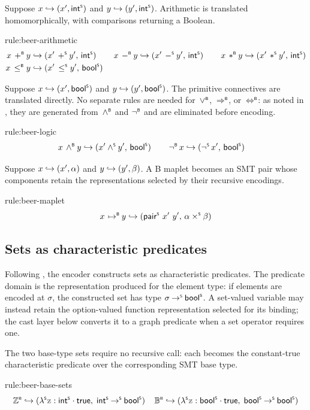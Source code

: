Suppose \(x \encto (x', \intS)\) and \(y \encto (y', \intS)\).
Arithmetic is translated homomorphically, with comparisons returning a Boolean.
\begin{encrule}[arithmetic]{rule:beer-arithmetic}
\[
\begin{aligned}
  x \addB y &\encto (x' \addS y',\, \intS)\mkern20mu
  & x \subB y &\encto (x' \subS y',\, \intS)\mkern20mu
  & x \mulB y &\encto (x' \mulS y',\, \intS) \\
  x \leB y &\encto (x' \leS y',\, \boolS)
\end{aligned}
\]
\end{encrule}

Suppose \(x \encto (x', \boolS)\) and \(y \encto (y', \boolS)\).
The primitive connectives are translated directly.
No separate rules are needed for \(\orB\), \(\impB\), or \(\iffB\): as noted in , they are generated from \(\andB\) and \(\notB\) and are eliminated before encoding.
\begin{encrule}[logic]{rule:beer-logic}
\[
\begin{aligned}
  x \andB y &\encto (x' \andS y',\, \boolS)\mkern20mu
  & \notB x &\encto (\notS x',\, \boolS)
\end{aligned}
\]
\end{encrule}

Suppose \(x \encto (x', \alpha)\) and \(y \encto (y', \beta)\).
A B maplet becomes an SMT pair whose components retain the representations selected by their recursive encodings.
\begin{encrule}[maplet]{rule:beer-maplet}
\[
  x \mapletB y \encto (\pairS{x'}{y'},\, \alpha \timesS \beta)
\]
\end{encrule}

\subsection{Sets as characteristic predicates}
\label{sec:beer-rules-sets}

Following , the encoder constructs sets as characteristic predicates.
The predicate domain is the representation produced for the element type: if elements are encoded at \(\sigma\), the constructed set has type \(\sigma \toS \boolS\).
A set-valued variable may instead retain the option-valued function representation selected for its binding; the cast layer below converts it to a graph predicate when a set operator requires one.

The two base-type sets require no recursive call: each becomes the constant-true characteristic predicate over the corresponding SMT base type.
\begin{encrule}{rule:beer-base-sets}
\[
  \ZintB \encto (\lamS \var{z} : \intS \cdot \mathsf{true},\; \intS \toS \boolS)\mkern20mu
  \ZboolB \encto (\lamS \var{z} : \boolS \cdot \mathsf{true},\; \boolS \toS \boolS)
\]
\end{encrule}

